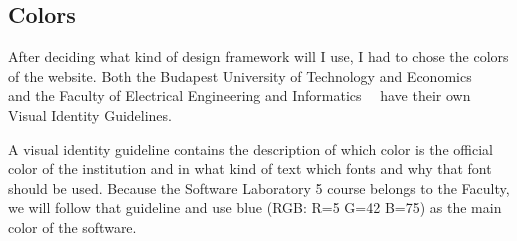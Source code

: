 \subsection{Colors}

After deciding what kind of design framework will I use, I had to chose the colors of the website. Both the Budapest University of Technology and Economics~\cite{BME-Arculat}~\cite{BME-Arculat-Intranet} and the Faculty of Electrical Engineering and Informatics~\cite{VIK-Arculat}~\cite{VIK-Arculat-PDF} have their own Visual Identity Guidelines. 

A visual identity guideline contains the description of which color is the official color of the institution and in what kind of text which fonts and why that font should be used. Because the Software Laboratory 5 course belongs to the Faculty, we will follow that guideline and use blue (RGB: R=5 G=42 B=75) as the main color of the software. 


